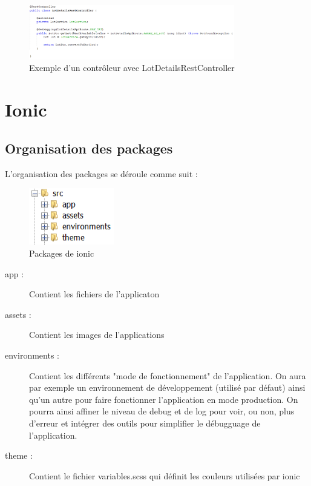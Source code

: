 			\begin{figure}[H]
				\centering\includegraphics[width=0.80\textwidth, keepaspectratio]{res/lotsController.png}
				\caption{Exemple d'un contrôleur avec LotDetailsRestController}
			\end{figure}


	\section{Ionic}

		\subsection{Organisation des packages}

			L'organisation des packages se déroule comme suit :

			\begin{figure}[H]
				\centering\includegraphics[width=0.33\textwidth, keepaspectratio]{res/ionicPackage.png}
				\caption{Packages de ionic}
			\end{figure}

			\begin{description}
				\item[app :]{Contient les fichiers de l'applicaton}
				\item[assets :]{Contient les images de l'applications}
				\item[environments :]{Contient les différents "mode de fonctionnement" de l'application. On aura par exemple un environnement de développement (utilisé par défaut) ainsi qu'un autre pour faire fonctionner l'application en mode production. On pourra ainsi affiner le niveau de debug et de log pour voir, ou non, plus d'erreur et intégrer des outils pour simplifier le débugguage de l'application.}
				\item[theme :]{Contient le fichier variables.scss qui définit les couleurs utilisées par ionic}
			\end{description}

